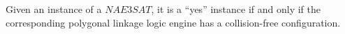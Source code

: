 

\begin{thm}\label{thm:Satisfiability-1}
 Given an instance of a $NAE3SAT$,  it is a ``yes'' instance if and only if the 
corresponding polygonal linkage logic engine has a collision-free configuration.
\end{thm}

